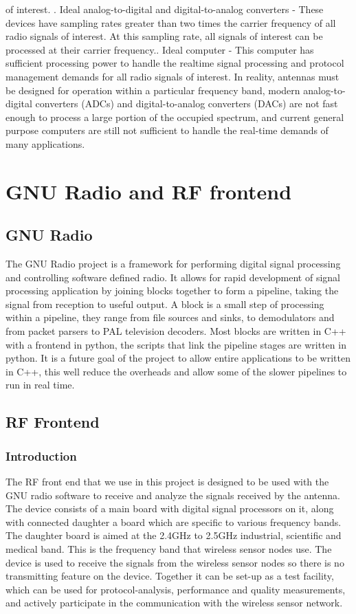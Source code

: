 \documentclass[a4paper,10pt]{article}
\begin{document}
of interest. . Ideal analog-to-digital and
digital-to-analog converters - These devices have sampling rates
greater than two times the carrier frequency of all radio signals of
interest. At this sampling rate, all signals of interest can be
processed at their carrier frequency.. Ideal computer -
This computer has sufficient processing power to handle the realtime
signal processing and protocol management demands for all radio
signals of interest. In reality, antennas must be designed for
operation within a particular frequency band, modern
analog-to-digital converters (ADCs) and digital-to-analog converters
(DACs) are not fast enough to process a large portion of the
occupied spectrum, and current general purpose computers are still
not sufficient to handle the real-time demands of many applications.
\newpage
\section{GNU Radio and RF frontend}
\subsection{GNU Radio}
The GNU Radio project is a framework for performing digital signal
processing and controlling software defined radio. It allows for
rapid development of signal processing application by joining blocks
together to form a pipeline, taking the signal from reception to
useful output. A block is a small step of processing within a
pipeline, they range from file sources and sinks, to demodulators
and from packet parsers to PAL television decoders. Most blocks are
written in C++ with a frontend in python, the scripts that link the
pipeline stages are written in python. It is a future goal of the
project to allow entire applications to be written in C++, this well
reduce the overheads and allow some of the slower pipelines to run
in real time.
\subsection{RF Frontend}
\subsubsection{Introduction}
The RF front end that we use in this project is designed to be used
with the GNU radio software to receive and analyze the signals
received by the antenna. The device consists of a main board with
digital signal processors on it, along with connected daughter a
board which are specific to various frequency bands. The daughter
board is aimed at the 2.4GHz to 2.5GHz industrial, scientific and
medical band. This is the frequency band that wireless sensor nodes
use. The device is used to receive the signals from the wireless
sensor nodes so there is no transmitting feature on the device.
Together it can be set-up as a test facility, which can be used for
protocol-analysis, performance and quality measurements, and
actively participate in the communication with the wireless sensor
network.
\end{document}
